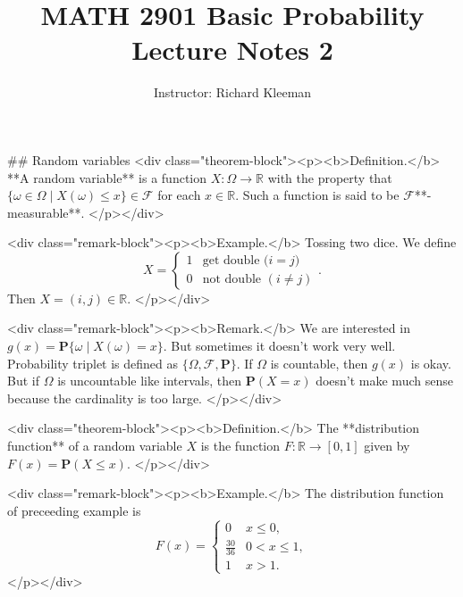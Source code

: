 


\title{MATH 2901 Basic Probability Lecture Notes 2}
\author{Instructor: Richard Kleeman}
\date{}
\maketitle


## Random variables
<div class="theorem-block"><p><b>Definition.</b> 
**A random variable** is a function $X: \Omega \to \mathbb{R}$ with the property that $\{ \omega\in \Omega \;\vert\; X(\omega) \leq x\} \in \mathcal{F}$ for each $x \in \mathbb{R}$. Such a function is said to be $\mathbf{\mathcal{F}}$**-measurable**. 
</p></div>

<div class="remark-block"><p><b>Example.</b> 
Tossing two dice. We define 
$$\begin{equation}
    X = \begin{cases} 1 & \text{get double ($i=j$)} \\ 0 & \text{not double $(i\neq j)$} \end{cases}.
\end{equation}$$
Then $X = (i,j) \in \mathbb{R}$.
</p></div>

<div class="remark-block"><p><b>Remark.</b> 
We are interested in $g(x) = \mathbf{P}\{ \omega \;\vert\; X(\omega) = x \}$. But sometimes it doesn't work very well. Probability triplet is defined as $\{ \Omega, \mathcal{F}, \mathbf{P} \}$. If $\Omega$ is countable, then $g(x)$ is okay. But if $\Omega$ is uncountable like intervals, then $\mathbf{P}(X=x)$ doesn't make much sense because the cardinality is too large.
</p></div>

<div class="theorem-block"><p><b>Definition.</b> 
The **distribution function** of a random variable $X$ is the function $F: \mathbb{R} \to 
[0, 1]$ given by $F(x) = \mathbf{P}(X \leq x)$. 
</p></div>

<div class="remark-block"><p><b>Example.</b> 
The distribution function of preceeding example is 
$$\begin{equation}
    F(x) = \begin{cases} 0 & x \leq 0, \\ \frac{30}{36} & 0 < x \leq 1, \\ 1 & x > 1. \end{cases}
\end{equation}$$
</p></div>

